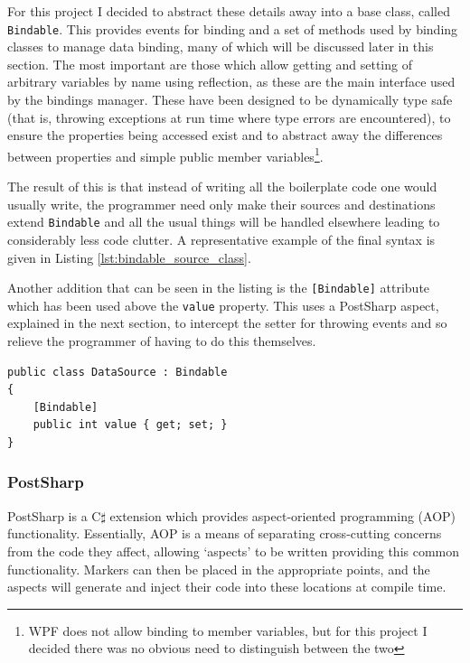 \documentclass[12pt,twoside,notitlepage]{report}
\begin{document}
For this project I decided to abstract these details away into a base class, called \texttt{Bindable}. This provides events for binding and a set of methods used by binding classes to manage data binding, many of which will be discussed later in this section. The most important are those which allow getting and setting of arbitrary variables by name using reflection, as these are the main interface used by the bindings manager. These have been designed to be dynamically type safe (that is, throwing exceptions at run time where type errors are encountered), to ensure the properties being accessed exist and to abstract away the differences between properties and simple public member variables\footnote{WPF does not allow binding to member variables, but for this project I decided there was no obvious need to distinguish between the two}.

The result of this is that instead of writing all the boilerplate code one would usually write, the programmer need only make their sources and destinations extend \texttt{Bindable} and all the usual things will be handled elsewhere leading to considerably less code clutter. A representative example of the final syntax is given in Listing \ref{lst:bindable_source_class}.

Another addition that can be seen in the listing is the \texttt{[Bindable]} attribute which has been used above the \texttt{value} property. This uses a PostSharp aspect, explained in the next section, to intercept the setter for throwing events and so relieve the programmer of having to do this themselves.

\begin{lstlisting}[language={[Sharp]C}, caption={Creating a bindable source class}, label=lst:bindable_source_class]
public class DataSource : Bindable
{
	[Bindable]
	public int value { get; set; }
}
\end{lstlisting}

\subsubsection*{PostSharp}

PostSharp is a C$\sharp$ extension which provides aspect-oriented programming (AOP) functionality. Essentially, AOP is a means of separating cross-cutting concerns from the code they affect, allowing `aspects' to be written providing this common functionality. Markers can then be placed in the appropriate points, and the aspects will generate and inject their code into these locations at compile time.
\end{document}
